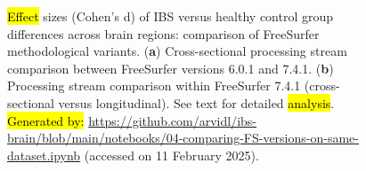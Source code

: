 \documentclass[diagnostics,article,accept,pdftex,moreauthors]{Definitions/mdpi}
\begin{document}
\begin{figure}[H]
\caption{{{\hl{Effect} %
 sizes (Cohen's d) of IBS versus healthy control group differences across brain regions: comparison of FreeSurfer methodological variants}}. {(\textbf{a}) Cross-sectional} processing stream comparison between FreeSurfer versions 6.0.1 and 7.4.1. (\textbf{b}) Processing stream comparison within FreeSurfer 7.4.1 (cross-sectional versus longitudinal). See text for detailed \hl{analysis}. %
{\hl{Generated by:} {{\url{https://github.com/arvidl/ibs-brain/blob/main/notebooks/04-comparing-FS-versions-on-same-dataset.ipynb}}}} (accessed on 11 February 2025).}
\label{fig:effect_sizes_601_vs_741_vs_741_longitudinal}
\end{figure} 




 
\end{document}
